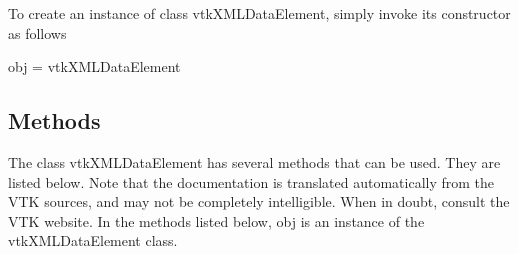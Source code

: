 To create an instance of class vtk\-X\-M\-L\-Data\-Element, simply invoke its constructor as follows \begin{DoxyVerb}  obj = vtkXMLDataElement
\end{DoxyVerb}
 \hypertarget{vtkwidgets_vtkxyplotwidget_Methods}{}\subsection{Methods}\label{vtkwidgets_vtkxyplotwidget_Methods}
The class vtk\-X\-M\-L\-Data\-Element has several methods that can be used. They are listed below. Note that the documentation is translated automatically from the V\-T\-K sources, and may not be completely intelligible. When in doubt, consult the V\-T\-K website. In the methods listed below, {\ttfamily obj} is an instance of the vtk\-X\-M\-L\-Data\-Element class. 
